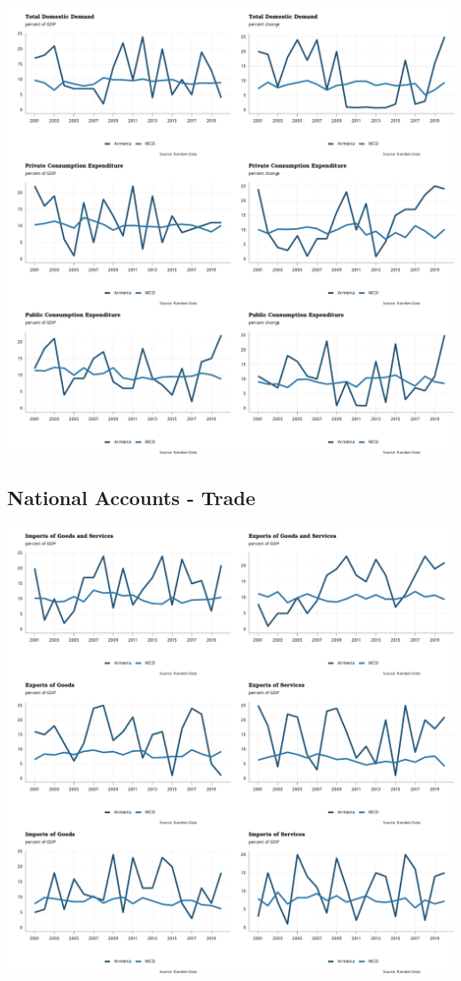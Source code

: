 \documentclass[
]{article}
\begin{document}
\begin{center}\includegraphics{RandomData_MCD__files/figure-latex/demand-1} \end{center}
\newpage

\hypertarget{national-accounts---trade}{%
\subsection{National Accounts - Trade}\label{national-accounts---trade}}

\begin{center}\includegraphics{RandomData_MCD__files/figure-latex/trade-1} \end{center}
\newpage
\end{document}
